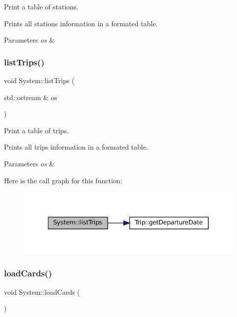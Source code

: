 Print a table of stations. 

Prints all stations\textquotesingle{} information in a formated table.


\begin{DoxyParams}{Parameters}
{\em os} & \\
\hline
\end{DoxyParams}
\mbox{\label{classSystem_af11f201f6417c2658f35238d98c6f032}} 
\subsubsection{\texorpdfstring{list\+Trips()}{listTrips()}}
{\footnotesize\ttfamily void System\+::list\+Trips (\begin{DoxyParamCaption}\item[{std\+::ostream \&}]{os }\end{DoxyParamCaption})}



Print a table of trips. 

Prints all trips\textquotesingle{} information in a formated table.


\begin{DoxyParams}{Parameters}
{\em os} & \\
\hline
\end{DoxyParams}
Here is the call graph for this function\+:
\nopagebreak
\begin{figure}[H]
\begin{center}
\leavevmode
\includegraphics[width=341pt]{classSystem_af11f201f6417c2658f35238d98c6f032_cgraph}
\end{center}
\end{figure}
\mbox{\label{classSystem_a32ef7e1c914ff8a237bc28de8c6aeedf}} 
\subsubsection{\texorpdfstring{load\+Cards()}{loadCards()}}
{\footnotesize\ttfamily void System\+::load\+Cards (\begin{DoxyParamCaption}{ }\end{DoxyParamCaption})}

